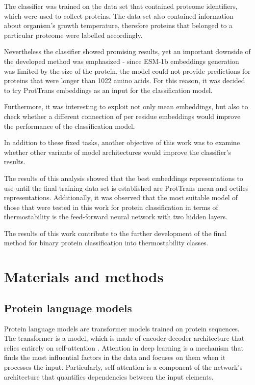 \documentclass[12pt]{article}
\begin{document}
    The classifier was trained on the data set 
	\cite{engqvist_martin_karl_magnus_2018_1175609} that contained 
	proteome identifiers, which were used 
    to collect proteins. The data set also contained information 
	about organism's growth temperature, therefore proteins that 
	belonged to a particular proteome were labelled accordingly. 

    Nevertheless the classifier showed promising results, yet an
    important downside of the developed method was emphasized -
    since ESM-1b embeddings generation was limited by the size 
    of the protein, the model could not provide predictions for 
    proteins that were longer than 1022 amino acids. For this 
    reason, it was decided to try ProtTrans 
	\cite{elnaggar2020prottrans} embeddings as an 
    input for the classification model.

    Furthermore, it was interesting to exploit not only mean 
    embeddings, but also to check whether a different 
    connection of per residue embeddings would improve the 
    performance of the classification model.

    In addition to these fixed tasks, another objective of 
	this work was to examine whether other variants of model
	architectures would improve the classifier's results.

	The results of this analysis showed that the best embeddings 
	representations to use until the final training data set is 
	established are ProtTrans mean and octiles representations. 
	Additionally, it was observed that the most suitable model 
	of those that were tested in this work for protein classification in
	terms of thermostability is the feed-forward 
	neural network with two hidden layers.

    The results of this work contribute to the further development of
	the final method for binary protein classification into 
	thermostability classes.

	\normalsize
	
	\newpage

	\section{Materials and methods}

	\subsection{Protein language models}

	Protein language models are transformer models trained on protein sequences.
	The transformer is a model, which is made of encoder-decoder architecture 
	that relies entirely on self-attention \cite{vaswani2017attention}. 
	Attention in deep learning is a mechanism that finds the most influential
	factors in the data and focuses on them when it processes the input. 
	Particularly, self-attention is a component of the network's architecture
	that quantifies dependencies between the input elements.
\end{document}
